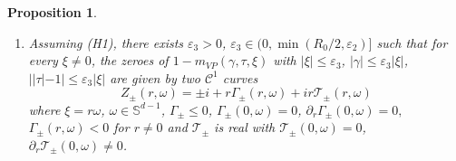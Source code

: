 \documentclass[11pt]{amsart}
\numberwithin{equation}{section}
\newtheorem{prop}{Proposition}[section]
\newcommand{\eps}{\varepsilon}
\begin{document}
\begin{prop}
\begin{enumerate}
\begin{equation}
 \end{equation}
 \item[v)]  Assuming (H1), there exists $\eps_{3}>0$, $\eps_{3}\in (0,  \min(R_{0}/2, \eps_{2})]$ such that for every $\xi \neq 0$, the zeroes of $1-m_{VP}(\gamma, \tau, \xi)$
  with  $|\xi | \leq \eps_{3}$, $|\gamma | \leq \eps_{3} | \xi|$, $ | |\tau| - 1 | \leq \eps_3|\xi| $ are given by two $\mathscr{C}^1$  curves
     $$ Z_{\pm}(r, \omega) = \pm i + r  \Gamma_{\pm}(r, \omega)    +  i r \mathcal{T}_{\pm}(r, \omega)$$ where
     $\xi= r \omega$, $\omega \in \mathbb{S}^{d-1}$, 
      $\Gamma_{\pm} \leq 0$,  $\Gamma_{\pm}(0, \omega)= 0 $,  $\partial_{r} \Gamma_{\pm}(0, \omega)=0,$ $\Gamma_{\pm}(r, \omega)<0$ for $r \neq 0$ and 
       $\mathcal{T}_{\pm}$ is real with  $ \mathcal{T}_{\pm}(0, \omega)=0$,     $\partial_{r} \mathcal{T}_{\pm}(0, \omega)\neq 0$.
 
 \end{enumerate}

\end{prop}
\end{document}
